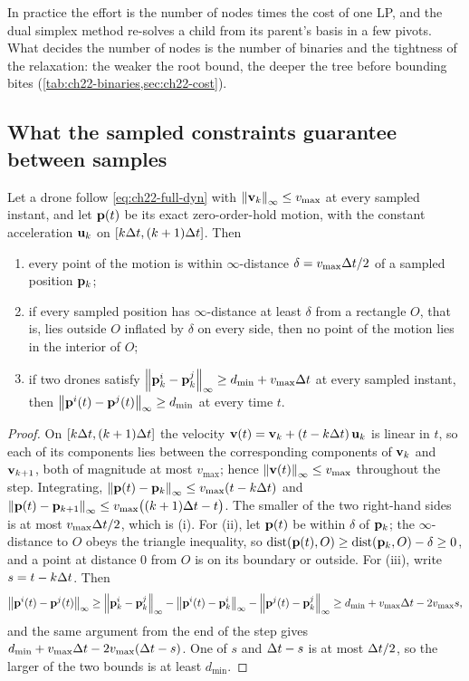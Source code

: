 In practice the effort is the number of nodes times the cost of one LP,
and the dual simplex method re-solves a child from its parent's basis in a
few pivots. What decides the number of nodes is the number of binaries and
the tightness of the relaxation: the weaker the root bound, the deeper the
tree before bounding bites (\cref{tab:ch22-binaries,sec:ch22-cost}).

\subsection{What the sampled constraints guarantee between samples}

\begin{proposition}
\label{prop:ch22-intersample}
Let a drone follow \cref{eq:ch22-full-dyn} with $\left\lVert \mathbf{v}_k \right\rVert_\infty \le
v_{\max}$ at every sampled instant, and let $\mathbf{p}(t)$ be its exact
zero-order-hold motion, with the constant acceleration $\mathbf{u}_k$ on
$[k\Delta t, (k+1)\Delta t]$. Then
\begin{enumerate}[label=(\roman*)]
  \item every point of the motion is within $\infty$-distance $\delta =
        v_{\max}\Delta t/2$ of a sampled position $\mathbf{p}_k$;
  \item if every sampled position has $\infty$-distance at least $\delta$
        from a rectangle $O$, that is, lies outside $O$ inflated by
        $\delta$ on every side, then no point of the motion lies in the
        interior of $O$;
  \item if two drones satisfy $\left\lVert \mathbf{p}^i_k - \mathbf{p}^j_k \right\rVert_\infty \ge
        d_{\min} + v_{\max}\Delta t$ at every sampled instant, then
        $\left\lVert \mathbf{p}^i(t) - \mathbf{p}^j(t) \right\rVert_\infty \ge d_{\min}$ at every time $t$.
\end{enumerate}
\end{proposition}
\begin{proof}
On $[k\Delta t, (k+1)\Delta t]$ the velocity $\mathbf{v}(t) = \mathbf{v}_k + (t - k\Delta t)\,\mathbf{u}_k$
is linear in $t$, so each of its components lies between the corresponding
components of $\mathbf{v}_k$ and $\mathbf{v}_{k+1}$, both of magnitude at most
$v_{\max}$; hence $\left\lVert \mathbf{v}(t) \right\rVert_\infty \le v_{\max}$ throughout the
step. Integrating, $\left\lVert \mathbf{p}(t) - \mathbf{p}_k \right\rVert_\infty \le v_{\max}(t - k\Delta t)$
and $\left\lVert \mathbf{p}(t) - \mathbf{p}_{k+1} \right\rVert_\infty \le v_{\max}\bigl((k+1)\Delta t -
t\bigr)$. The smaller of the two right-hand sides is at most
$v_{\max}\Delta t/2$, which is (i). For (ii), let $\mathbf{p}(t)$ be within $\delta$
of $\mathbf{p}_k$; the $\infty$-distance to $O$ obeys the triangle inequality,
so $\operatorname{dist}(\mathbf{p}(t), O) \ge \operatorname{dist}(\mathbf{p}_k, O) - \delta \ge 0$, and a point at
distance $0$ from $O$ is on its boundary or outside. For (iii), write
$s = t - k\Delta t$. Then
\[
  \left\lVert \mathbf{p}^i(t) - \mathbf{p}^j(t) \right\rVert_\infty
  \ge \left\lVert \mathbf{p}^i_k - \mathbf{p}^j_k \right\rVert_\infty
      - \left\lVert \mathbf{p}^i(t) - \mathbf{p}^i_k \right\rVert_\infty - \left\lVert \mathbf{p}^j(t) - \mathbf{p}^j_k \right\rVert_\infty
  \ge d_{\min} + v_{\max}\Delta t - 2 v_{\max} s,
\]
and the same argument from the end of the step gives $d_{\min} +
v_{\max}\Delta t - 2 v_{\max}(\Delta t - s)$. One of $s$ and $\Delta t - s$ is at most
$\Delta t/2$, so the larger of the two bounds is at least $d_{\min}$.
\end{proof}

